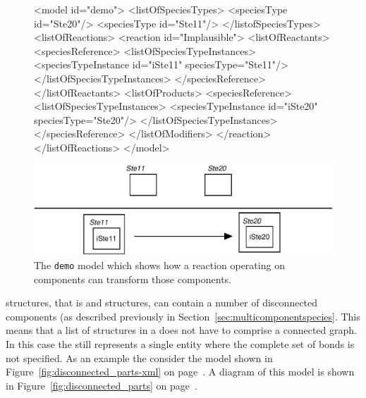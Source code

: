 \documentclass{cekarticle}
\begin{document}
\begin{figure}[h]

\begin{example}
<model id="demo">
    <listOfSpeciesTypes>
        <speciesType id="Ste20"/>
        <speciesType id="Ste11"/>
    </listofSpeciesTypes>
    <listOfReactions>
        <reaction id="Implausible">
            <listOfReactants>
                <speciesReference>
                    <listOfSpeciesTypeInstances>
                        <speciesTypeInstance id="iSte11" speciesType="Ste11"/>
                    </listOfSpeciesTypeInstances>
                </speciesReference>
            </listOfReactants>
            <listOfProducts>
                <speciesReference>
                    <listOfSpeciesTypeInstances>
                        <speciesTypeInstance id="iSte20" speciesType="Ste20"/>
                    </listOfSpeciesTypeInstances>
                </speciesReference>
            </listOfModifiers>
        </reaction>
    </listOfReactions>
</model>
\end{example}
  \vspace*{8pt}
  \centering
  \includegraphics[scale = 0.7]{demo.eps}
  \caption{The \texttt{demo} model which shows how a reaction operating on
  components can transform those components.}
  \label{fig:demo}
\end{figure}

 structures, that is  and 
structures, can contain a number of disconnected components (as described previously in
Section~\ref{sec:multicomponentspecies}.  This means that a list of 
structures in a  does not have to comprise a connected graph.
In this case the  still represents a single entity where the complete set of
bonds is not specified.  As an example the
consider the model shown in Figure~\ref{fig:disconnected_parts-xml} on
page~\pageref{fig:disconnected_parts-xml}.  A diagram of this model is shown in
Figure~\ref{fig:disconnected_parts} on page~\pageref{fig:disconnected_parts}.
\end{document}

